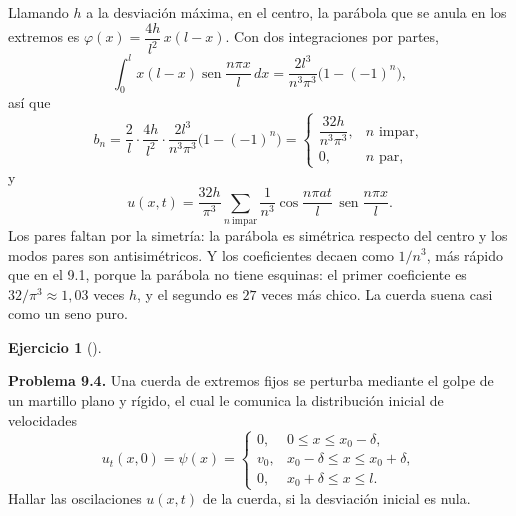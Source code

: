 \documentclass[
  spanish,
  a4paper,
]{scrbook}
\theoremstyle{definition}
\theoremstyle{plain}
\theoremstyle{definition}
\theoremstyle{plain}
\theoremstyle{definition}
\newtheorem{exercise}{Ejercicio}[chapter]
\theoremstyle{remark}
\begin{document}
\begin{tcolorbox}[enhanced jigsaw, arc=.35mm, bottomrule=.15mm, bottomtitle=1mm, breakable, colback=white, colbacktitle=quarto-callout-tip-color!10!white, colframe=quarto-callout-tip-color-frame, coltitle=black, left=2mm, leftrule=.75mm, opacityback=0, opacitybacktitle=0.6, rightrule=.15mm, title=\textcolor{quarto-callout-tip-color}{\faLightbulb}\hspace{0.5em}{Solución}, titlerule=0mm, toprule=.15mm, toptitle=1mm]

Llamando \(h\) a la desviación máxima, en el centro, la parábola que se
anula en los extremos es \(\varphi(x) = \dfrac{4h}{l^2}\,x(l-x)\). Con
dos integraciones por partes, \[
\int_0^l x(l-x)\operatorname{sen}\frac{n\pi x}{l}\,dx = \frac{2l^3}{n^3\pi^3}\big(1-(-1)^n\big),
\] así que \[
b_n = \frac2l\cdot\frac{4h}{l^2}\cdot\frac{2l^3}{n^3\pi^3}\big(1-(-1)^n\big) =
\begin{cases}\dfrac{32h}{n^3\pi^3}, & n \text{ impar},\\[2mm] 0, & n\text{ par},\end{cases}
\] y \[
u(x,t) = \frac{32h}{\pi^3}\sum_{n\ \text{impar}}\frac{1}{n^3}\cos\frac{n\pi at}{l}\,\operatorname{sen}\frac{n\pi x}{l}.
\] Los pares faltan por la simetría: la parábola es simétrica respecto
del centro y los modos pares son antisimétricos. Y los coeficientes
decaen como \(1/n^3\), más rápido que en el 9.1, porque la parábola no
tiene esquinas: el primer coeficiente es \(32/\pi^3\approx1{,}03\) veces
\(h\), y el segundo es \(27\) veces más chico. La cuerda suena casi como
un seno puro.

\end{tcolorbox}

\begin{exercise}[]\protect\hypertarget{exr-hip-p4}{}\label{exr-hip-p4}

\textbf{Problema 9.4.} Una cuerda de extremos fijos se perturba mediante
el golpe de un martillo plano y rígido, el cual le comunica la
distribución inicial de velocidades \[
u_t(x,0) = \psi(x) = \begin{cases} 0, & 0\le x\le x_0-\delta,\\ v_0, & x_0-\delta\le x\le x_0+\delta,\\ 0, & x_0+\delta\le x\le l.\end{cases}
\] Hallar las oscilaciones \(u(x,t)\) de la cuerda, si la desviación
inicial es nula.

\end{exercise}
\end{document}

